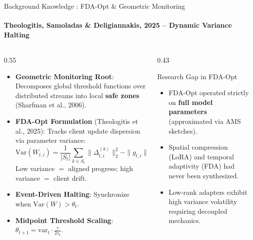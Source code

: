 \documentclass[aspectratio=169]{beamer}
\begin{document}
\begin{frame}{Background Knowledge : FDA-Opt \& Geometric Monitoring}
    \framesubtitle{Theologitis, Samoladas \& Deligiannakis, 2025 -- Dynamic Variance Halting}
    \begin{columns}
        \begin{column}{0.55\textwidth}
            \begin{itemize}
                \footnotesize
                \item \textbf{Geometric Monitoring Root}: Decomposes global threshold functions over distributed streams into local \textbf{safe zones} (Sharfman et al., 2006).
                \item \textbf{FDA-Opt Formulation} (Theologitis et al., 2025): Tracks client update dispersion via parameter variance:
                {\small $$\text{Var}(W_{t,i}) = \frac{1}{|S_t|}\sum_{k \in S_t} \|\Delta_{t,i}^{(k)}\|_2^2 - \|g_{t,i}\|_2^2$$}
                Low variance $=$ aligned progress; high variance $=$ client drift.
                \item \textbf{Event-Driven Halting}: Synchronize when $\text{Var}(W) > \theta_t$.
                \item \textbf{Midpoint Threshold Scaling}: $\theta_{t+1} = \text{var}_t \cdot \frac{\tau}{2 s_t}$.
            \end{itemize}
        \end{column}
        \begin{column}{0.43\textwidth}
            \begin{block}{Research Gap in FDA-Opt}
                \footnotesize
                \begin{itemize}
                    \item FDA-Opt operated strictly on \textbf{full model parameters} (approximated via AMS sketches).
                    \item Spatial compression (LoRA) and temporal adaptivity (FDA) had never been synthesized.
                    \item Low-rank adapters exhibit high variance volatility requiring decoupled mechanics.
                \end{itemize}
            \end{block}
        \end{column}
    \end{columns}
\end{frame}
\end{document}
